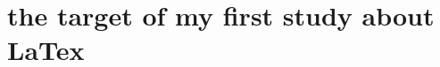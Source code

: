 \documentclass{article}
\begin{document}
\section{the target of my first study about LaTex}
\end{document}
